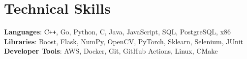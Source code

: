 \documentclass[letterpaper,11pt]{article}
\makeatletter
\newcommand{\resumeItem}[1]{
    \item\small{
        {#1 \vspace{-2pt}}
    }
}
\newcommand{\resumeSubheading}[4]{
    \vspace{-2pt}\item
        \begin{tabular*}{1.0\textwidth}[t]{l@{\extracolsep{\fill}}r}
            \textbf{#1} & \textbf{\small #2} \\
            \textit{\small#3} & \textit{\small #4} \\
        \end{tabular*}\vspace{-3pt}
}
\newcommand{\resumeSubHeadingListStart}{\begin{itemize}[leftmargin=0.0in, label={}]}
\newcommand{\resumeSubHeadingListEnd}{\end{itemize}}
\newcommand{\resumeItemListStart}{\begin{itemize}\vspace{-2pt}}
\newcommand{\resumeItemListEnd}{\end{itemize}\vspace{-2pt}}
\newcommand{\CPP}{C\texttt{++}}
\makeatother
\begin{document}
\section{\textcolor{accent}{Technical Skills}}
 \begin{itemize}[leftmargin=0.15in, label={}]
    \small{\item{
     \textbf{Languages}{: \CPP, Go, Python, C, Java, JavaScript, SQL, PostgreSQL, x86} \\
     \textbf{Libraries}{: Boost, Flask, NumPy, OpenCV, PyTorch, Sklearn, Selenium, JUnit} \\
     \textbf{Developer Tools}{: AWS, Docker, Git, GitHub Actions, Linux, CMake
     }
    }}
 \end{itemize}
 \vspace{-16pt}

\begin{comment}
\section{\textcolor{accent}{Extracurricular}}
    \resumeSubHeadingListStart
        \resumeSubheading{Undergraduate Mentor/Teaching Assistant}{Jan 2025 -- May 2025}{Data Structures}{Rensselaer Polytechnic Institute}
            \resumeItemListStart
                \resumeItem{}
            \resumeItemListEnd

        \resumeSubheading{Rensselaer Center for Open Source (RCOS)}{Jan 2025 -- Dec 2025}{Mentor}{Rensselaer Polytechnic Institute}
            \resumeItemListStart
                \resumeItem{}
            \resumeItemListEnd
    \resumeSubHeadingListEnd
\end{comment}
\end{document}
